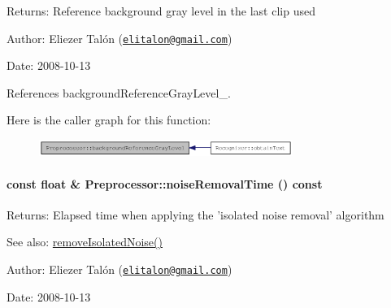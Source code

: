 \begin{Desc}
\item[Returns:]Reference background gray level in the last clip used\end{Desc}
\begin{Desc}
\item[Author:]Eliezer Talón (\href{mailto:elitalon@gmail.com}{\tt elitalon@gmail.com}) \end{Desc}
\begin{Desc}
\item[Date:]2008-10-13 \end{Desc}


References backgroundReferenceGrayLevel\_\-.

Here is the caller graph for this function:\nopagebreak
\begin{figure}[H]
\begin{center}
\leavevmode
\includegraphics[width=234pt]{class_preprocessor_b435116619b7b254d9e788476c012e8a_icgraph}
\end{center}
\end{figure}
\hypertarget{class_preprocessor_ff8eee937760e42c0c2bea307849ada1}{
\paragraph[noiseRemovalTime]{\setlength{\rightskip}{0pt plus 5cm}const float \& Preprocessor::noiseRemovalTime () const}\hfill}
\label{class_preprocessor_ff8eee937760e42c0c2bea307849ada1}


\begin{Desc}
\item[Returns:]Elapsed time when applying the 'isolated noise removal' algorithm\end{Desc}
\begin{Desc}
\item[See also:]\hyperlink{class_preprocessor_a3e047486a0a80f2103f51d7141e41c5}{removeIsolatedNoise()}\end{Desc}
\begin{Desc}
\item[Author:]Eliezer Talón (\href{mailto:elitalon@gmail.com}{\tt elitalon@gmail.com}) \end{Desc}
\begin{Desc}
\item[Date:]2008-10-13 \end{Desc}


